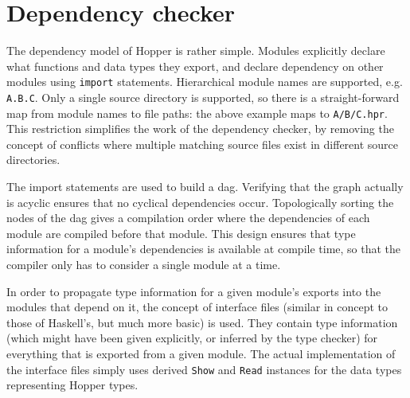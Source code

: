 \section{Dependency checker}
\label{sec:dai_depcheck}


The dependency model of Hopper is rather simple. Modules explicitly declare what functions and data types they export, and declare dependency
on other modules using \texttt{import} statements. Hierarchical module
names are supported, e.g. \texttt{A.B.C}. Only a single
source directory is supported, so there is a straight-forward map from module
names to file paths: the above example maps to \texttt{A/B/C.hpr}. This
restriction simplifies the work of the dependency checker, by removing the concept of conflicts where multiple matching source files exist in different source directories.

The import statements are used to build a \gls{dag}. Verifying that the graph actually is acyclic ensures that no cyclical dependencies occur. Topologically sorting the nodes of the \gls{dag} gives a compilation order where the dependencies of each module are compiled before that module. This design ensures that type information for a module's dependencies is available at compile time, so that the compiler only has to consider a single module at a time.

In order to propagate type information for a given module's exports into the modules that depend on it, the concept of interface files (similar in concept to those of Haskell's\cite{interfacefiles}, but much more basic) is used. They contain type information (which might have been given explicitly, or inferred by the type checker) for everything that is exported from a given module. The actual implementation of the interface files simply uses derived \texttt{Show} and \texttt{Read} instances for the data types representing Hopper types.


